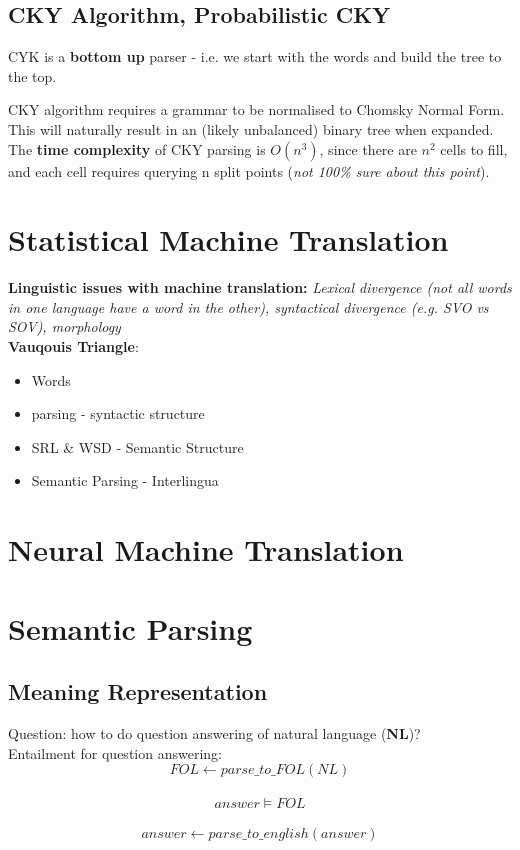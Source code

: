 \documentclass[]{article}
\begin{document}
	
	\subsection{CKY Algorithm, Probabilistic CKY}
	
	CYK is a \textbf{bottom up} parser - i.e. we start with the words and build the tree to the top. 
	
	CKY algorithm requires a grammar to be normalised to Chomsky Normal Form. This will naturally result in an (likely unbalanced) binary tree when expanded. \\
	
	The \textbf{time complexity} of CKY parsing is $O(n^3)$, since there are $n^2$ cells to fill, and each cell requires querying n split points (\textit{not 100\% sure about this point}). 
	
    \clearpage
	\section{Statistical Machine Translation}
	
	\textbf{Linguistic issues with machine translation:} \textit{Lexical divergence (not all words in one language have a word in the other), syntactical divergence (e.g. SVO vs SOV), morphology} \\
	
	\textbf{Vauqouis Triangle}:
	
	\begin{itemize}
		\item Words 
		\item parsing -  syntactic structure
		\item SRL \& WSD - Semantic Structure
		\item Semantic Parsing -  Interlingua
	\end{itemize}
	
	\clearpage
	\section{Neural Machine Translation}
	
	\clearpage 
	\section{Semantic Parsing}
	
	\subsection{Meaning Representation}
	Question: how to do question answering of natural language (\textbf{NL})? \\
	Entailment for question answering: $$FOL \gets parse\_to\_FOL(NL) $$ \\
              $$ answer \models FOL $$ \\
              $$ answer \gets parse\_to\_english(answer) $$ \\
              
\end{document}
